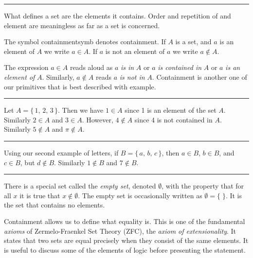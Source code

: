         \hrule\par\hfill\par
        What defines a set are the elements it contains. Order and repetition of
        and element are meaningless as far as a set is concerned.
        \begin{notation}
            The symbol \gls{containmentsymb} denotes containment.
            If $A$ is a set, and $a$ is an element of $A$ we write
            $a\in{A}$. If $a$ is not an element of $a$ we write $a\notin{A}$.
        \end{notation}
        The expression $a\in{A}$ reads aloud as $a$ \textit{is in} $A$ or
        $a$ \textit{is contained in} $A$ or $a$ \textit{is an element of} $A$.
        Similarly, $a\notin{A}$ reads $a$ \textit{is not in} $A$. Containment is
        another one of our primitives that is best described with example.
        \par\hfill\par\hrule
        \begin{example}
            Let $A=\{\,1,\,2,\,3\,\}$. Then we have $1\in{A}$ since 1 is an
            element of the set $A$. Similarly $2\in{A}$ and $3\in{A}$. However,
            $4\notin{A}$ since 4 is not contained in $A$. Similarly
            $5\notin{A}$ and $\pi\notin{A}$.
        \end{example}
        \hrule
        \begin{example}
            Using our second example of letters, if $B=\{\,a,\,b,\,c\,\}$, then
            $a\in{B}$, $b\in{B}$, and $c\in{B}$, but $d\notin{B}$. Similarly
            $1\notin{B}$ and $7\notin{B}$.
        \end{example}
        \hrule\par\hfill\par
        There is a special set called the \textit{empty set}, denoted
        $\emptyset$, with the property that for all $x$ it is true that
        $x\notin\emptyset$. The empty set is occasionally written as
        $\emptyset=\{\;\}$. It is the set that contains no elements.
        \par\hfill\par
        Containment allows us to define what equality is. This is one of the
        fundamental \textit{axioms} of Zermelo-Fraenkel Set Theory (ZFC), the
        \textit{axiom of extensionality}. It states that two sets are equal
        precisely when they consist of the same elements. It is useful to
        discuss some of the elements of logic before presenting the statement.
